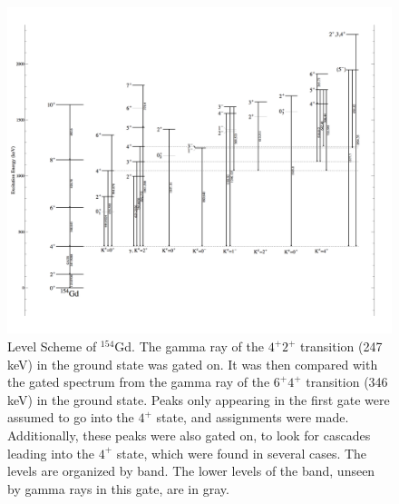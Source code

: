 \begin{figure}[!]
    \centering
    \includegraphics[scale=0.18]{154GdTablesAndFigs/154Gd_4to2.png}
    \caption{Level Scheme of $^{154}$Gd. The gamma ray of the $4^+$\rightarrow$2^+$ transition (247 keV) in the ground state was gated on. It was then compared with the gated spectrum from the gamma ray of the $6^+$\rightarrow$4^+$ transition (346 keV) in the ground state. Peaks only appearing in the first gate were assumed to go into the $4^+$ state, and assignments were made. Additionally, these peaks were also gated on, to look for cascades leading into the $4^+$ state, which were found in several cases. The levels are organized by band. The lower levels of the band, unseen by gamma rays in this gate, are in gray.}
    \label{fig:154_4to2}
\end{figure}